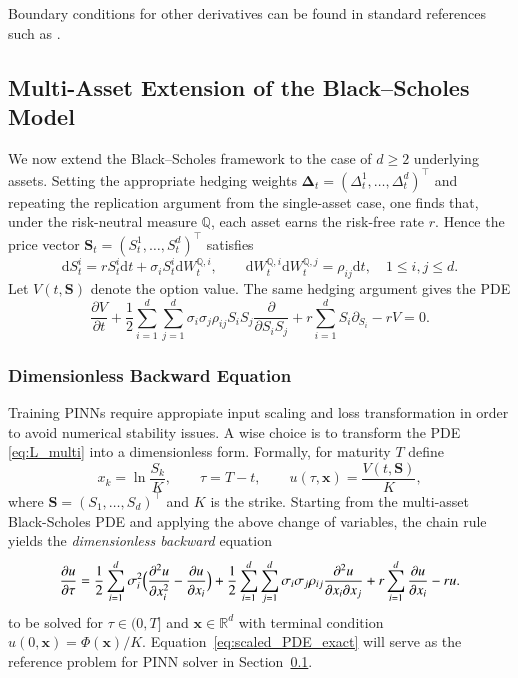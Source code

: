 \documentclass[12pt]{report} %
\theoremstyle{plain}           %
\theoremstyle{definition}      %
\theoremstyle{remark}          %
\begin{document}
Boundary conditions for other derivatives can be found in standard references such as \cite{Wilmott2010PaulWO}.

\subsection{Multi-Asset Extension of the Black--Scholes Model}\label{sec:multiasset}

We now extend the Black--Scholes framework to the case of \(d\ge2\) underlying assets.  Setting the
appropriate hedging weights \(\boldsymbol{\Delta}_t=(\Delta_t^{1},\dots,\Delta_t^{d})^{\top}\) and repeating the
replication argument from the single-asset case, one finds that, under the risk-neutral measure
\(\mathbb{Q}\), each asset earns the risk-free rate \(r\).  Hence the price vector
\(\mathbf{S}_t=(S_t^{1},\dots,S_t^{d})^{\top}\) satisfies
\begin{equation}\label{eq:gbm_multi_redux}
  \mathrm{d}S^i_t
  = rS^i_t\mathrm{d}t
  + \sigma_i S^i_t\mathrm{d}W^{\mathbb{Q},i}_t,
  \qquad
  \mathrm{d}W^{\mathbb{Q},i}_t\mathrm{d}W^{\mathbb{Q},j}_t
  = \rho_{ij}\mathrm{d}t,
  \quad 1\le i,j\le d.
\end{equation}
Let $V(t,\mathbf{S})$ denote the option value. The same hedging argument gives the PDE
\begin{equation}\label{eq:L_multi}
  \frac{\partial V}{\partial t} + \frac12\sum_{i=1}^d\sum_{j=1}^{d}
        \sigma_i\sigma_j\rho_{ij}
        S_iS_j\frac{\partial }{\partial S_i S_j}
     + r\sum_{i=1}^{d}S_i\partial_{S_i}
     - rV = 0.
\end{equation}

\subsubsection{Dimensionless Backward Equation}

Training PINNs require appropiate input scaling and loss transformation in order to avoid numerical stability
issues. A wise choice is to transform the PDE \eqref{eq:L_multi} into a dimensionless form. Formally, 
for maturity \(T\) define
\[
x_k=\ln\frac{S_k}{K},\qquad
\tau=T-t,\qquad
u(\tau,\mathbf{x})=\frac{V(t,\mathbf{S})}{K},
\]
where \(\mathbf{S}=(S_1,\dots,S_d)^{\!\top}\) and
\(K\) is the strike. Starting from the multi-asset Black-Scholes PDE and applying 
the above change of variables, the chain rule yields the
 \emph{dimensionless backward} equation
\begin{equation}
  \frac{\partial u}{\partial \tau} =
    \frac12\sum_{i=1}^{d}\sigma_i^{2}
        \Bigl(
            \frac{\partial^{2}u}{\partial x_i^{2}}
          - \frac{\partial u}{\partial x_i}
        \Bigr)
  + \frac12\sum_{i=1}^{d}\sum_{j=1}^{d}\sigma_i\sigma_j\rho_{ij}
        \frac{\partial^{2}u}{\partial x_i\partial x_j}
  + r\sum_{i=1}^{d}\frac{\partial u}{\partial x_i}
  - ru.
  \label{eq:scaled_PDE_exact}
\end{equation}
to be solved for
\(\tau\in(0,T]\) and \(\mathbf{x}\in\mathbb{R}^{d}\) with terminal
condition \(u(0,\mathbf{x})=\Phi(\mathbf{x})/K\). Equation~\eqref{eq:scaled_PDE_exact} will serve as the reference
problem for PINN solver in Section~\ref{sec:multiasset}.
\end{document}
